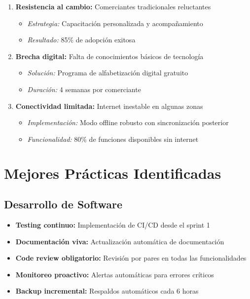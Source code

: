 \documentclass[12pt,a4paper]{report}
\begin{document}
\begin{enumerate}
	\item \textbf{Resistencia al cambio:} Comerciantes tradicionales reluctantes
	      \begin{itemize}
		      \item \textit{Estrategia:} Capacitación personalizada y acompañamiento
		      \item \textit{Resultado:} 85\% de adopción exitosa
	      \end{itemize}

	\item \textbf{Brecha digital:} Falta de conocimientos básicos de tecnología
	      \begin{itemize}
		      \item \textit{Solución:} Programa de alfabetización digital gratuito
		      \item \textit{Duración:} 4 semanas por comerciante
	      \end{itemize}

	\item \textbf{Conectividad limitada:} Internet inestable en algunas zonas
	      \begin{itemize}
		      \item \textit{Implementación:} Modo offline robusto con sincronización posterior
		      \item \textit{Funcionalidad:} 80\% de funciones disponibles sin internet
	      \end{itemize}
\end{enumerate}

\section{Mejores Prácticas Identificadas}

\subsection{Desarrollo de Software}

\begin{itemize}
	\item \textbf{Testing continuo:} Implementación de CI/CD desde el sprint 1
	\item \textbf{Documentación viva:} Actualización automática de documentación
	\item \textbf{Code review obligatorio:} Revisión por pares en todas las funcionalidades
	\item \textbf{Monitoreo proactivo:} Alertas automáticas para errores críticos
	\item \textbf{Backup incremental:} Respaldos automáticos cada 6 horas
\end{itemize}
\end{document}
